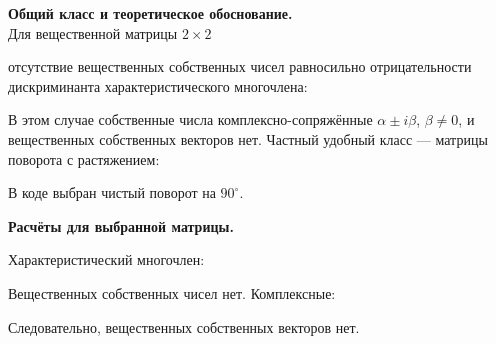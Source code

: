 \documentclass[a4paper,14pt]{extarticle}
\begin{document}
\textbf{Общий класс и теоретическое обоснование.}\\
Для вещественной матрицы \(2\times2\) \begin{center}\end{center} отсутствие вещественных собственных чисел равносильно отрицательности
дискриминанта характеристического многочлена: \begin{center}\end{center} В этом случае собственные числа комплексно-сопряжённые
\(\alpha\pm i\beta\), \(\beta\ne0\), и вещественных собственных векторов
нет. Частный удобный класс --- матрицы поворота с растяжением: \begin{center}\end{center} В коде выбран чистый поворот на \(90^\circ\).

\textbf{Расчёты для выбранной матрицы.} \begin{center}\end{center} \begin{center}\end{center} Характеристический многочлен: \begin{center}\end{center} Вещественных собственных чисел нет. Комплексные: \begin{center}\end{center} Следовательно, вещественных собственных векторов нет.
\end{document}
